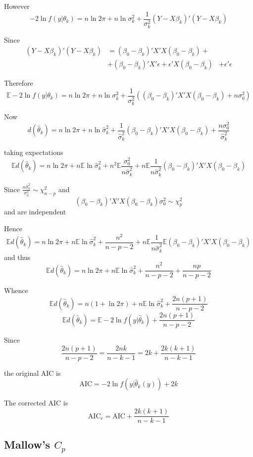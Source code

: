 \documentclass[a4paper]{article}
\newcommand{\brac}[1]{{\left ( #1 \right )}}
\newcommand{\induc}[1]{{\left . #1 \right \vert}}
\newcommand{\Ex}[0]{{\mathbb{E}}}
\begin{document}
However
\[-2\ln f\brac{\induc{y}\theta_k} = n \ln 2\pi +n\ln \sigma^2_k + \frac{1}{\sigma^2_k} \brac{Y-X\beta_k}'\brac{Y-X\beta_k}\]

Since 
\begin{align*}
	\brac{Y-X\beta_k}'\brac{Y-X\beta_k} &= \brac{\beta_0-\beta_k}'X'X\brac{\beta_0-\beta_k} + \\
		& + \brac{\beta_0 - \beta_k}'X'\epsilon + \epsilon'X\brac{\beta_0 - \beta_k}
		& + \epsilon'\epsilon
\end{align*}

Therefore 
\[\Ex-2\ln f\brac{\induc{y}\theta_k} = n \ln 2\pi + n\ln \sigma^2_k + \frac{1}{\sigma^2_k} \brac{ \brac{\beta_0-\beta_k}'X'X\brac{\beta_0-\beta_k} + n\sigma_0^2 }\]

Now 
\[d\brac{\hat{\theta}_k} = n \ln 2\pi + n\ln \hat{\sigma}^2_k + \frac{1}{\hat{\sigma}^2_k}\brac{\beta_0-\beta_k}'X'X\brac{\beta_0-\beta_k} + \frac{n\sigma_0^2}{\hat{\sigma}^2_k}\]

taking expectations
\[\Ex d\brac{\hat{\theta}_k} = n \ln 2\pi + n\Ex \ln \hat{\sigma}^2_k + n^2\Ex \frac{\sigma_0^2}{n\hat{\sigma}^2_k} + n \Ex \frac{1}{n\hat{\sigma}^2_k}\brac{\beta_0-\beta_k}'X'X\brac{\beta_0-\beta_k}\]

Since $\frac{n\hat{\sigma}^2_k}{\sigma_0^2} \sim \chi^2_{n-p}$ and 
\[\brac{\beta_0-\beta_k}'X'X\brac{\beta_0-\beta_k}{\sigma_0^2} \sim \chi^2_p\]
and are independent

Hence
\[\Ex d\brac{\hat{\theta}_k} = n \ln 2\pi + n\Ex \ln \hat{\sigma}^2_k + \frac{n^2}{n-p-2} + n \Ex \frac{1}{n\hat{\sigma}^2_k} \Ex \brac{\beta_0-\beta_k}'X'X\brac{\beta_0-\beta_k}\]
and thus 
\[\Ex d\brac{\hat{\theta}_k} = n \ln 2\pi + n\Ex \ln \hat{\sigma}^2_k + \frac{n^2}{n-p-2} + \frac{n p}{n-p-2} \]

Whence 
\[\Ex d\brac{\hat{\theta}_k} = n \brac{1+\ln 2\pi} + n\Ex \ln \hat{\sigma}^2_k + \frac{2n(p+1)}{n-p-2}\]
\[\Ex d\brac{\hat{\theta}_k} = \Ex -2 \ln f\brac{\induc{y}\hat{\theta}_k} + \frac{2n(p+1)}{n-p-2}\]

Since 
\[\frac{2n(p+1)}{n-p-2} = \frac{2nk}{n-k-1} = 2k + \frac{2k(k+1)}{n-k-1}\]

the original AIC is
\[\text{AIC} = -2 \ln f\brac{\induc{y}\hat{\theta}_k(y)} + 2k\]

The corrected AIC is 
\[\text{AIC}_c = \text{AIC} + \frac{2k(k+1)}{n-k-1}\]


\subsection{Mallow's $C_p$} %
\label{sub:mallows_cp}
\end{document}
